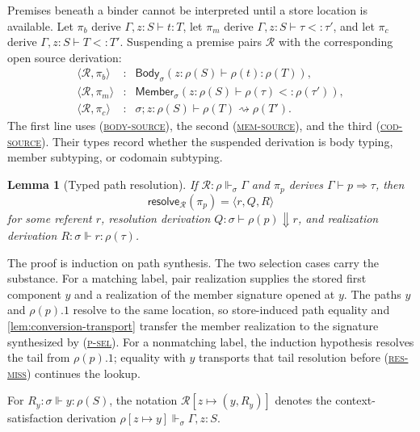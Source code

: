 \documentclass[acmsmall,screen,nonacm]{acmart}
\newtheorem{lemma}[theorem]{Lemma}
\newcommand{\ruleref}[1]{%
  \textsc{(\hyperref[rule:#1]{#1})}}
\newcommand{\resolve}{\Downarrow}
\newcommand{\realizes}{\Vdash}
\newcommand{\coerce}{\mathrel{\rightsquigarrow}}
\newcommand{\bodycl}[5]{%
  \mathsf{Body}_{#1}(#2\!:\!#3\vdash #4:#5)}
\newcommand{\membercl}[5]{%
  \mathsf{Member}_{#1}(#2\!:\!#3\vdash #4<:#5)}
\newcommand{\resolvepi}[2]{\mathsf{resolve}_{#1}(#2)}
\newcommand{\closure}[3]{\langle #1,#2\rangle}
\begin{document}
Premises beneath a binder cannot be interpreted until a store location is
available. Let \(\pi_b\) derive \(\Gamma,z:S\vdash t:T\), let
\(\pi_m\) derive \(\Gamma,z:S\vdash\tau<:\tau'\), and let \(\pi_c\)
derive \(\Gamma,z:S\vdash T<:T'\). Suspending a premise pairs
\(\mathcal R\) with the corresponding open source derivation:
\[
\begin{array}{rcl}
\closure{\mathcal R}{\pi_b}{body}
  &:& \bodycl{\sigma}{z}{\rho(S)}{\rho(t)}{\rho(T)},
\\
\closure{\mathcal R}{\pi_m}{mem}
  &:& \membercl{\sigma}{z}{\rho(S)}{\rho(\tau)}{\rho(\tau')},
\\
\closure{\mathcal R}{\pi_c}{cod}
  &:& \sigma;z:\rho(S)\vdash\rho(T)\coerce\rho(T').
\end{array}
\]
The first line uses \ruleref{body-source}, the second \ruleref{mem-source}, and
the third \ruleref{cod-source}. Their types record whether the suspended
derivation is body typing, member subtyping, or codomain subtyping.

\begin{lemma}[Typed path resolution]
\label{lem:typed-resolution}
If \(\mathcal R:\rho\realizes_\sigma\Gamma\) and
\(\pi_p\) derives \(\Gamma\vdash p\Rightarrow\tau\), then
\[
  \resolvepi{\mathcal R}{\pi_p}=\langle r,Q,R\rangle
\]
for some referent \(r\), resolution derivation
\(Q:\sigma\vdash\rho(p)\resolve r\), and realization derivation
\(R:\sigma\realizes r:\rho(\tau)\).
\end{lemma}

The proof is induction on path synthesis. The two selection cases carry
the substance. For a matching label, pair realization supplies the stored
first component \(y\) and a realization of the member signature opened at
\(y\). The paths \(y\) and \(\rho(p).1\) resolve to the same location, so
store-induced path equality and \cref{lem:conversion-transport} transfer the
member realization to the signature synthesized by \ruleref{p-sel}. For a
nonmatching label, the induction hypothesis resolves the tail from
\(\rho(p).1\); equality with \(y\) transports that tail resolution before
\ruleref{res-miss} continues the lookup.

For \(R_y:\sigma\realizes y:\rho(S)\), the notation
\(\mathcal R[z\mapsto(y,R_y)]\) denotes the context-satisfaction derivation
\(\rho[z\mapsto y]\realizes_\sigma\Gamma,z:S\).
\end{document}
